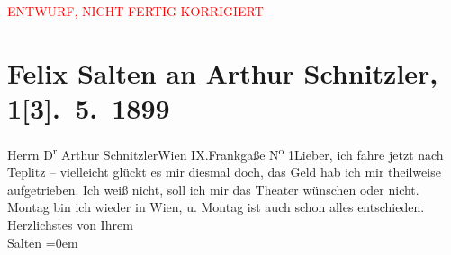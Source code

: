 
\begin{center}
            \textcolor{red}{ENTWURF, NICHT FERTIG KORRIGIERT}
                      \end{center}
            
         \renewcommand{\erwaehnteOrte}{Orte: Frankgasse, IX., Alsergrund, Teplice, Wien}
         \renewcommand{\erwaehnteWerke}{}
               \section[Felix Salten an Arthur Schnitzler, 1{[}3{]}. 5. 1899]{ Felix Salten an Arthur Schnitzler, 1{[}3{]}. 5. 1899}\nopagebreak{}\rehead{ }\begin{ledgroupsized}[t]{13cm}\normalsize\beginnumbering \toendnotes[C]{\smallbreak\pagebreak[2]} 
\pstart{}{\pb}Herrn D\textsuperscript{r} Arthur Schnitzler\pend{}\pstart{}Wien IX.\pend{}\pstart{}Frankgaße N\textsuperscript{o} 1\pend{}{\bigskip}\pstart{}{\pb}Lieber,\pend\pstart
           ich fahre jetzt nach Teplitz – vielleicht glückt
               es mir diesmal doch, das Geld hab ich mir theilweise aufgetrieben. Ich weiß nicht,
               soll ich mir  das Theater wünschen oder
               nicht.\pend
           \pstart
           Montag bin ich wieder in Wien, u.
               Montag ist auch schon alles entschieden. \pend
           \pstart
           Herzlichstes von Ihrem {\\[\baselineskip]}\spacefill\mbox{Salten}\pend
           \leftskip=0em{}
         
         \endnumbering{}\end{ledgroupsized}\begin{anhang}\end{anhang}\newcommand{\dateiname}{L03292}\newcommand{\titel}{Felix Salten an Arthur Schnitzler, 1[3]. 5. 1899}\newcommand{\editorInnen}{Martin Anton Müller und Laura Untner}
      